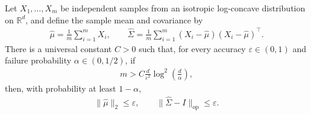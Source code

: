 \documentclass[12pt,cleveref]{jmlr}
\newcommand{\R}{\mathbb R}
\newcommand{\op}{\mathrm{op}}
\newcommand{\1}{\mathbf 1}
\newcommand{\eps}{\varepsilon}
\begin{document}
\begin{lemma}
    \label{lem:covariance-estimation}
    Let $X_1,\ldots,X_m$ be independent samples from an isotropic
    log-concave distribution on $\R^d$, and define the sample mean and
    covariance by
    \begin{align}
        \hat\mu=\frac1m\sum_{i=1}^m X_i,
        \qquad
        \widehat\Sigma=\frac1m\sum_{i=1}^m
        (X_i-\hat\mu)(X_i-\hat\mu)^\top.
    \end{align}
    There is a universal constant $C>0$ such that, for every accuracy
    $\eps\in(0,1)$ and failure probability $\alpha\in(0,1/2)$, if
    \begin{align}
        m>C\frac{d}{\eps^2}\log^2\!\left(\frac d\alpha\right),
    \end{align}
    then, with probability at least $1-\alpha$,
    \begin{align}
        \|\hat\mu\|_2\leq\eps,
        \qquad
        \|\widehat\Sigma-I\|_{\op}\leq\eps.
    \end{align}
\end{lemma}
\end{document}
